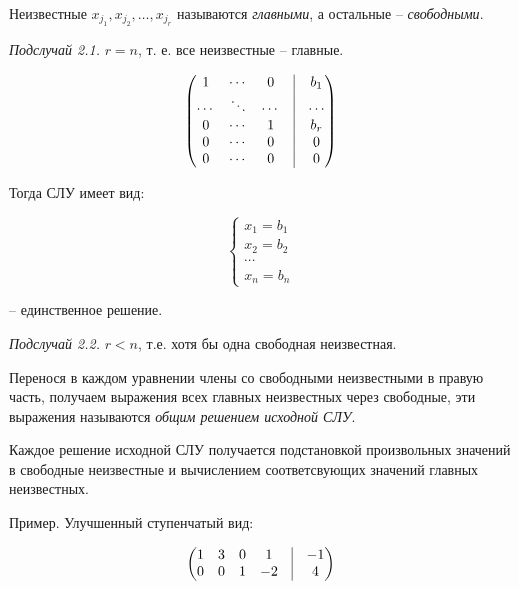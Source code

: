 Неизвестные $x_{j_1}, x_{j_2}, \dots , x_{j_r}$ называются \textit{главными}, а остальные -- \textit{свободными}.

\bigskip
\textit{Подслучай 2.1.} $r = n$, т. е. все неизвестные -- главные.

\begin{equation*}
	\begin{pmatrix}
		1 & \cdots & 0 & \vrule & b_1 \\
        \cdots & \ddots & \cdots & \vrule & \cdots \\
        0 & \cdots & 1 & \vrule & b_r \\
       0 & \cdots & 0 & \vrule & 0 \\
       0 & \cdots & 0 & \vrule & 0
	\end{pmatrix}
\end{equation*}

Тогда СЛУ имеет вид: 

\begin{equation*}
	\left\{
		\begin{aligned}
        x_1 = b_1 \\
        x_2 = b_2 \\
        \cdots \\
        x_n = b_n
		\end{aligned}
	\right.
\end{equation*}

-- единственное решение.

\bigskip
\textit{Подслучай 2.2.} $r < n$, т.е. хотя бы одна свободная неизвестная.

Перенося в каждом уравнении члены со свободными неизвестными в правую часть, получаем выражения всех главных неизвестных через свободные, эти выражения называются \textit{общим решением исходной СЛУ}.

Каждое решение исходной СЛУ получается подстановкой произвольных значений в свободные неизвестные и вычислением соответсвующих значений главных неизвестных.

\begin{comment}
	И тогда СЛУ имеет бесконечно много решений.
\end{comment}

Пример. Улучшенный ступенчатый вид: 

\begin{equation*}
	\begin{pmatrix}
		1 & 3 & 0 & 1 & \vrule & -1 \\
		0 & 0 & 1 & -2 & \vrule & 4
	\end{pmatrix}
\end{equation*}

